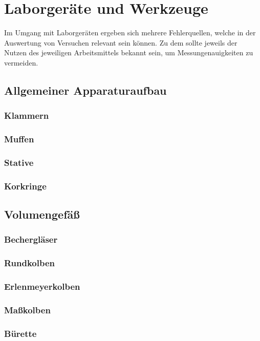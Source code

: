 \section{Laborgeräte und Werkzeuge}
Im Umgang mit Laborgeräten ergeben sich mehrere Fehlerquellen, welche in der Auswertung von Versuchen relevant sein können. Zu dem sollte jeweils der Nutzen des jeweiligen Arbeitsmittels bekannt sein, um Messungenauigkeiten zu vermeiden.

\subsection{Allgemeiner Apparaturaufbau}
\subsubsection{Klammern}
\subsubsection{Muffen}
\subsubsection{Stative}
\subsubsection{Korkringe}

\subsection{Volumengefäß}
\subsubsection{Bechergläser}
\subsubsection{Rundkolben}
\subsubsection{Erlenmeyerkolben}
\subsubsection{Maßkolben}
\subsubsection{Bürette}

